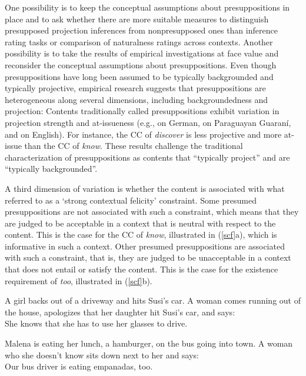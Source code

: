 \documentclass[11pt,fleqn]{article}
\def\infelic{{\leavevmode\llap{\#}}}
\newcommand{\6}{\mbox{$[\hspace*{-.6mm}[$}}
\newcommand{\9}{\mbox{$]\hspace*{-.6mm}]$}}
\begin{document}
One possibility is to keep the conceptual assumptions about presuppositions in place and to ask whether there are more suitable measures to distinguish presupposed projection inferences from nonpresupposed ones than inference rating tasks or comparison of naturalness ratings across contexts. Another possibility is to take the results of empirical investigations at face value and reconsider the conceptual assumptions about presuppositions. Even though presuppositions have long been assumed to be typically backgrounded and typically projective, empirical research suggests that presuppositions are heterogeneous along several dimensions, including backgroundedness and projection: Contents traditionally called presuppositions exhibit variation in projection strength and at-issueness (e.g., \citealt{xue-onea11} on German, \citealt{tonhauser-guarani-variability} on Paraguayan Guaran\'i, and \citealt{demarneffe-etal-sub23,tbd-variability,degen-tonhauser-language} on English). For instance, the CC of {\em discover} is less projective and more at-issue than the CC of {\em know}. These results challenge the traditional characterization of presuppositions as contents that ``typically project'' and are ``typically backgrounded''.

A third dimension of variation is whether the content is associated with what \citealt*{brst-lang11} referred to as a `strong contextual felicity' constraint. Some presumed presuppositions are not associated with such a constraint, which means that they are judged to be acceptable in a context that is neutral with respect to the content. This is the case for the CC of {\em know}, illustrated in (\ref{scf}a), which is informative in such a context. Other presumed presuppositions are associated with such a constraint, that is, they are judged to be unacceptable in a context that does not entail or satisfy the content. This is the case for the existence requirement of {\em too}, illustrated in (\ref{scf}b).

\begin{exe}
\ex\label{scf} \citealt[78, 80]{brst-lang11}
\begin{xlist}
\ex A girl backs out of a driveway and hits Susi's car. A woman comes running out of the house, apologizes that her daughter hit Susi's car, and says: \\ She knows that she has to use her glasses to drive.

\ex Malena is eating her lunch, a hamburger, on the bus going into town. A woman who she doesn't know sits down next to her and says:
\\ \infelic Our bus driver is eating empanadas, too.

\end{xlist}
\end{exe}
\end{document}

